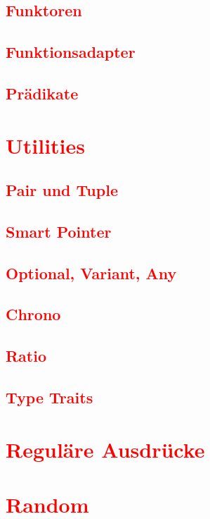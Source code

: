 \subsection{\textcolor{red}{Funktoren}}\label{sec:functors}
\subsection{\textcolor{red}{Funktionsadapter}}\label{sec:function-adapters}
\subsection{\textcolor{red}{Prädikate}}\label{sec:predicates}
\section{\textcolor{red}{Utilities}}\label{sec:utilities}
\subsection{\textcolor{red}{Pair und Tuple}}\label{sec:pair-tuple}
\subsection{\textcolor{red}{Smart Pointer}}\label{sec:smart-pointers-std}
\subsection{\textcolor{red}{Optional, Variant, Any}}\label{sec:optional-variant-any}
\subsection{\textcolor{red}{Chrono}}\label{sec:chrono}
\subsection{\textcolor{red}{Ratio}}\label{sec:ratio}
\subsection{\textcolor{red}{Type Traits}}\label{sec:type-traits}
\section{\textcolor{red}{Reguläre Ausdrücke}}\label{sec:regex}
\section{\textcolor{red}{Random}}\label{sec:random}
